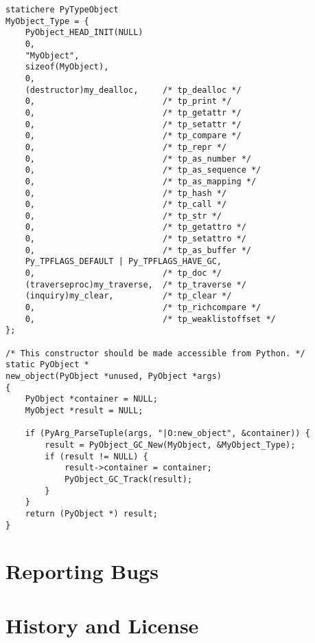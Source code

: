 \documentclass{manual}
\begin{document}
\begin{verbatim}
statichere PyTypeObject
MyObject_Type = {
    PyObject_HEAD_INIT(NULL)
    0,
    "MyObject",
    sizeof(MyObject),
    0,
    (destructor)my_dealloc,     /* tp_dealloc */
    0,                          /* tp_print */
    0,                          /* tp_getattr */
    0,                          /* tp_setattr */
    0,                          /* tp_compare */
    0,                          /* tp_repr */
    0,                          /* tp_as_number */
    0,                          /* tp_as_sequence */
    0,                          /* tp_as_mapping */
    0,                          /* tp_hash */
    0,                          /* tp_call */
    0,                          /* tp_str */
    0,                          /* tp_getattro */
    0,                          /* tp_setattro */
    0,                          /* tp_as_buffer */
    Py_TPFLAGS_DEFAULT | Py_TPFLAGS_HAVE_GC,
    0,                          /* tp_doc */
    (traverseproc)my_traverse,  /* tp_traverse */
    (inquiry)my_clear,          /* tp_clear */
    0,                          /* tp_richcompare */
    0,                          /* tp_weaklistoffset */
};

/* This constructor should be made accessible from Python. */
static PyObject *
new_object(PyObject *unused, PyObject *args)
{
    PyObject *container = NULL;
    MyObject *result = NULL;

    if (PyArg_ParseTuple(args, "|O:new_object", &container)) {
        result = PyObject_GC_New(MyObject, &MyObject_Type);
        if (result != NULL) {
            result->container = container;
            PyObject_GC_Track(result);
        }
    }
    return (PyObject *) result;
}
\end{verbatim}


%


\appendix
\chapter{Reporting Bugs}


\chapter{History and License}


\end{document}
